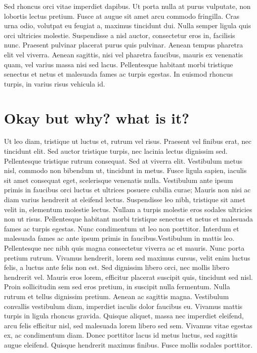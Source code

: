 Sed rhoncus orci vitae imperdiet dapibus. Ut porta nulla at purus vulputate, non lobortis lectus pretium. Fusce at augue sit amet arcu commodo fringilla. Cras urna odio, volutpat eu feugiat a, maximus tincidunt dui. Nulla semper ligula quis orci ultricies molestie. Suspendisse a nisl auctor, consectetur eros in, facilisis nunc. Praesent pulvinar placerat purus quis pulvinar. Aenean tempus pharetra elit vel viverra. Aenean sagittis, nisi vel pharetra faucibus, mauris ex venenatis quam, vel varius massa nisi sed lacus. Pellentesque habitant morbi tristique senectus et netus et malesuada fames ac turpis egestas. In euismod rhoncus turpis, in varius risus vehicula id.

\section{Okay but why? what is it?}

Ut leo diam, tristique ut luctus et, rutrum vel risus. Praesent vel finibus erat, nec tincidunt elit. Sed auctor tristique turpis, nec lacinia lectus dignissim sed. Pellentesque tristique rutrum consequat. Sed at viverra elit. Vestibulum metus nisl, commodo non bibendum ut, tincidunt in metus. Fusce ligula sapien, iaculis sit amet consequat eget, scelerisque venenatis nulla. Vestibulum ante ipsum primis in faucibus orci luctus et ultrices posuere cubilia curae; Mauris non nisi ac diam varius hendrerit at eleifend lectus. Suspendisse leo nibh, tristique sit amet velit in, elementum molestie lectus. Nullam a turpis molestie eros sodales ultricies non ut risus. Pellentesque habitant morbi tristique senectus et netus et malesuada fames ac turpis egestas. Nunc condimentum ut leo non porttitor. Interdum et malesuada fames ac ante ipsum primis in faucibus.Vestibulum in mattis leo. Pellentesque nec nibh quis magna consectetur viverra ac et mauris. Nunc porta pretium rutrum. Vivamus hendrerit, lorem sed maximus cursus, velit enim luctus felis, a luctus ante felis non est. Sed dignissim libero orci, nec mollis libero hendrerit vel. Mauris eros lorem, efficitur placerat suscipit quis, tincidunt sed nisl. Proin sollicitudin sem sed eros pretium, in suscipit nulla fermentum. Nulla rutrum et tellus dignissim pretium. Aenean ac sagittis magna. Vestibulum convallis vestibulum diam, imperdiet iaculis dolor faucibus eu. Vivamus mattis turpis in ligula rhoncus gravida. Quisque aliquet, massa nec imperdiet eleifend, arcu felis efficitur nisl, sed malesuada lorem libero sed sem. Vivamus vitae egestas ex, ac condimentum diam. Donec porttitor lacus id metus luctus, sed sagittis augue eleifend. Quisque hendrerit maximus finibus. Fusce mollis sodales porttitor.

